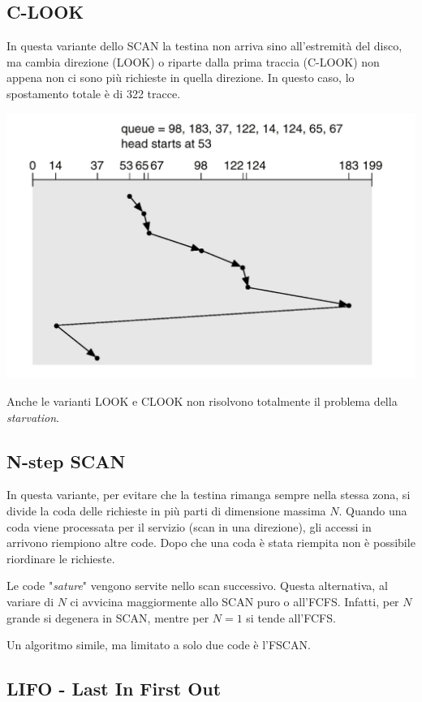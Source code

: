 \documentclass[a4paper,12pt, twoside]{report}
\begin{document}
\subsection{C-LOOK}
In questa variante dello SCAN la testina non arriva sino all'estremit\`a del disco, ma cambia direzione
(LOOK) o riparte dalla prima traccia (C-LOOK) non appena non ci sono pi\`u richieste in quella direzione. 
In questo caso, lo spostamento totale \`e di 322 tracce.
\begin{center}
    \includegraphics[scale=0.2]{clook_disk}
\end{center}
Anche le varianti LOOK e CLOOK non risolvono totalmente il problema della \emph{starvation}. 

\subsection{N-step SCAN}
In questa variante, per evitare che la testina rimanga sempre nella stessa zona, si divide la coda delle
richieste in pi\`u parti di dimensione massima $N$. Quando una coda viene processata per il servizio 
(scan in una direzione), gli accessi in arrivono riempiono altre code. Dopo che una coda \`e stata riempita
non \`e possibile riordinare le richieste. 

Le code "\emph{sature}" vengono servite nello scan successivo. Questa alternativa, al variare di $N$ ci
avvicina maggiormente allo SCAN puro o all'FCFS. Infatti, per $N$ grande si degenera in SCAN, mentre per
$N = 1$ si tende all'FCFS. 

Un algoritmo simile, ma limitato a solo due code \`e l'FSCAN.

\subsection{LIFO - Last In First Out}
\end{document}
